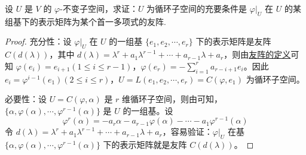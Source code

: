 \documentclass[../../main.tex]{subfiles}
\begin{document}
\begin{theorem}\label{theorem:不变子空间是循环子空间的充要条件}
设 \(U\) 是 \(V\) 的 \(\varphi\)-不变子空间，求证：\(U\) 为循环子空间的充要条件是 \(\varphi|_U\) 在 \(U\) 的某组基下的表示矩阵为某个首一多项式的友阵.
\end{theorem}
\begin{proof}
{\heiti 充分性：}设 \(\varphi|_U\) 在 \(U\) 的一组基 \(\{e_1,e_2,\cdots,e_r\}\) 下的表示矩阵是友阵 \(C(d(\lambda))\)，其中 \(d(\lambda)=\lambda^r + a_1\lambda^{r - 1}+\cdots + a_{r - 1}\lambda + a_r\)，则由\hyperref[proposition:多项式的友矩和Frobenius块]{友阵的定义}可知 \(\varphi(e_i)=e_{i + 1}(1\leq i\leq r - 1)\)，\(\varphi(e_r)=-\sum_{i = 1}^{r}a_{r - i + 1}e_i\)。因此 \(e_i=\varphi^{i - 1}(e_1)(2\leq i\leq r)\)，\(U = L(e_1,e_2,\cdots,e_r)=C(\varphi,e_1)\) 为循环子空间。

{\heiti 必要性：}设 \(U = C(\varphi,\alpha)\) 是 \(r\) 维循环子空间，则由可知，\(\{\alpha,\varphi(\alpha),\cdots,\varphi^{r - 1}(\alpha)\}\) 是 \(U\) 的一组基。设 
\[
\varphi^r(\alpha)=-a_r\alpha - a_{r - 1}\varphi(\alpha)-\cdots - a_1\varphi^{r - 1}(\alpha)
\]
令 \(d(\lambda)=\lambda^r + a_1\lambda^{r - 1}+\cdots + a_{r - 1}\lambda + a_r\)，容易验证：\(\varphi|_U\) 在基 \(\{\alpha,\varphi(\alpha),\cdots,\varphi^{r - 1}(\alpha)\}\) 下的表示矩阵就是友阵 \(C(d(\lambda))\)。
\end{proof}
\end{document}
